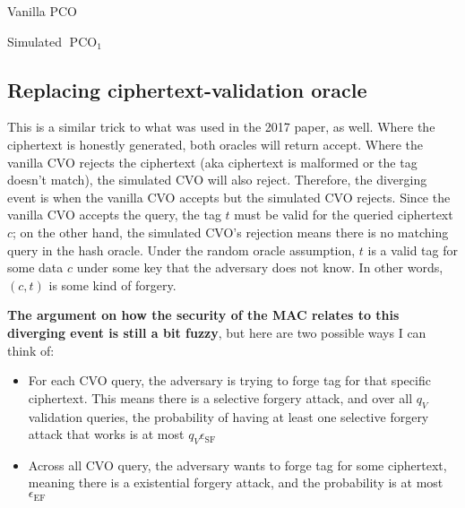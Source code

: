 \documentclass{article}
\begin{document}
\begin{multicols}{2}
    \begin{algorithm}[H]
        \SetAlgoLined
        \caption{Vanilla PCO}
    \end{algorithm}

    \columnbreak

    \begin{algorithm}[H]
        \SetAlgoLined
        \caption{Simulated $\operatorname{PCO}_1$}
    \end{algorithm}
\end{multicols}

\subsection{Replacing ciphertext-validation oracle}\label{replacing-cvo}
This is a similar trick to what was used in the 2017 paper, as well. Where the ciphertext is honestly generated, both oracles will return accept. Where the vanilla CVO rejects the ciphertext (aka ciphertext is malformed or the tag doesn't match), the simulated CVO will also reject. Therefore, the diverging event is when the vanilla CVO accepts but the simulated CVO rejects. Since the vanilla CVO accepts the query, the tag $t$ must be valid for the queried ciphertext $c$; on the other hand, the simulated CVO's rejection means there is no matching query in the hash oracle. Under the random oracle assumption, $t$ is a valid tag for some data $c$ under some key that the adversary does not know. In other words, $(c, t)$ is some kind of forgery.

\textbf{The argument on how the security of the MAC relates to this diverging event is still a bit fuzzy}, but here are two possible ways I can think of:

\begin{itemize}
    \item For each CVO query, the adversary is trying to forge tag for that specific ciphertext. This means there is a selective forgery attack, and over all $q_V$ validation queries, the probability of having at least one selective forgery attack that works is at most $q_V\epsilon_\text{SF}$
    
    \item Across all CVO query, the adversary wants to forge tag for some ciphertext, meaning there is a existential forgery attack, and the probability is at most $\epsilon_\text{EF}$
\end{itemize}
\end{document}
